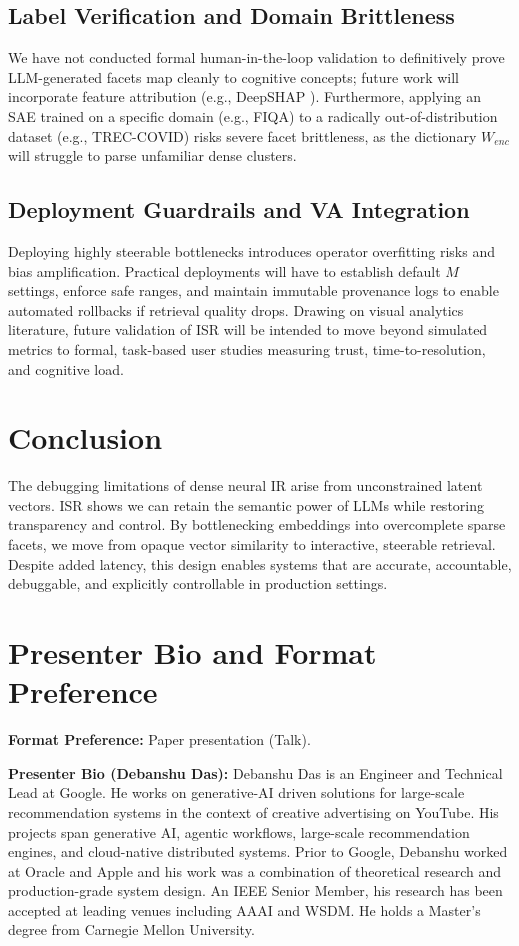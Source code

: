 \documentclass[sigconf,authordraft]{acmart}
\begin{document}
\subsection{Label Verification and Domain Brittleness}  
We have not conducted formal human-in-the-loop validation to definitively prove LLM-generated facets map cleanly to cognitive concepts; future work will incorporate feature attribution (e.g., DeepSHAP \cite{fernando2019}). Furthermore, applying an SAE trained on a specific domain (e.g., FIQA) to a radically out-of-distribution dataset (e.g., TREC-COVID) risks severe facet brittleness, as the dictionary $W_{enc}$ will struggle to parse unfamiliar dense clusters.

\subsection{Deployment Guardrails and VA Integration} 
Deploying highly steerable bottlenecks introduces operator overfitting risks and bias amplification. Practical deployments will have to establish default $M$ settings, enforce safe ranges, and maintain immutable provenance logs to enable automated rollbacks if retrieval quality drops. Drawing on visual analytics literature, future validation of ISR will be intended to move beyond simulated metrics to formal, task-based user studies measuring trust, time-to-resolution, and cognitive load.

\section{Conclusion}
The debugging limitations of dense neural IR arise from unconstrained latent vectors. ISR shows we can retain the semantic power of LLMs while restoring transparency and control. By bottlenecking embeddings into overcomplete sparse facets, we move from opaque vector similarity to interactive, steerable retrieval. Despite added latency, this design enables systems that are accurate, accountable, debuggable, and explicitly controllable in production settings.

\section*{Presenter Bio and Format Preference}
\textbf{Format Preference:} Paper presentation (Talk).

\textbf{Presenter Bio (Debanshu Das):} Debanshu Das is an Engineer and Technical Lead at Google. He works on generative-AI driven solutions for large-scale recommendation systems in the context of creative advertising on YouTube. His projects span generative AI, agentic workflows, large-scale recommendation engines, and cloud-native distributed systems. Prior to Google, Debanshu worked at Oracle and Apple and his work was a combination of theoretical research and production-grade system design. An IEEE Senior Member, his research has been accepted at leading venues including AAAI and WSDM. He holds a Master’s degree from Carnegie Mellon University.
\end{document}
